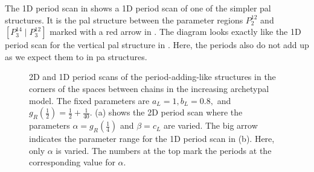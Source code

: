 The 1D period scan in  shows a 1D period scan of one of the simpler \gls{pal} structures.
It is the \gls{pal} structure between the parameter regions $P^{12}_2$ and $\left[P^{14}_3 \mid P^{12}_3\right]$ marked with a red arrow in .
The diagram looks exactly like the 1D period scan for the vertical \gls{pal} structure in .
Here, the periods also do not add up as we expect them to in \gls{pa} structures.

\begin{figure}
	\centering
	\caption[2D and 1D period scans of period-adding-like structures in the corners of the spaces between chains in the increasing archetypal model]{
		2D and 1D period scans of the period-adding-like structures in the corners of the spaces between chains in the increasing archetypal model.
		The fixed parameters are $a_L = 1, b_L = 0.8,$ and $g_R\left(\frac{1}{2}\right) = \frac{1}{2} + \frac{1}{40}$.
		(a) shows the 2D period scan where the parameters $\alpha = g_R\left(\frac{1}{4}\right)$ and $\beta = c_L$ are varied.
		The big arrow indicates the parameter range for the 1D period scan in (b).
		Here, only $\alpha$ is varied.
		The numbers at the top mark the periods at the corresponding value for $\alpha$.
	}
	\label{fig:add.add.like.corn}
\end{figure}

